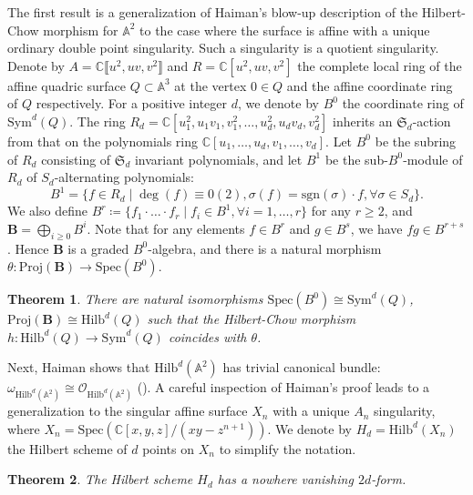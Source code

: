 \documentclass{amsart}[12pt]
\newtheorem{theorem}{Theorem}[section]
\theoremstyle{definition}
\theoremstyle{remark}
\numberwithin{equation}{section}
\begin{document}
The first result is a generalization of Haiman's blow-up description of the Hilbert-Chow morphism for $\mathbb{A}^2$ to the case where the surface is affine with a unique ordinary double point singularity. Such a singularity is a quotient singularity. Denote by $A = \mathbb{C}\llbracket u^2, uv, v^2 \rrbracket$ and $R = \mathbb{C}[u^2, uv, v^2]$ the complete local ring of the affine quadric surface $Q \subset \mathbb{A}^3$ at the vertex $0 \in Q$ and the affine coordinate ring of $Q$ respectively. For a positive integer $d$, we denote by $B^0$ the coordinate ring of $\mathrm{Sym}^d(Q)$. The ring $R_{d} = \mathbb{C}[u_1^2, u_1v_1, v_1^2, \dots, u_d^2, u_dv_d, v_d^2]$ inherits an $\mathfrak{S}_d$-action from that on the polynomials ring $\mathbb{C}[u_1, \dots, u_d, v_1, \dots, v_d]$. Let $B^0$ be the subring of $R_d$ consisting of $\mathfrak{S}_d$ invariant polynomials, and let $B^1$ be the sub-$B^0$-module of $R_d$ of $S_d$-alternating polynomials:
\[
B^1 = \{f \in R_d \mid \deg(f) \equiv 0(2),  \sigma  (f) = \mathrm{sgn}(\sigma) \cdot f, \forall \sigma \in S_d\}.
\]
We also define $B^r \coloneqq \{f_1 \cdot \dots \cdot f_r \mid f_i \in B^1, \forall i = 1, \dots, r\}$ for any $r \geq 2$, and $\mathbf{B} = \bigoplus_{i \geq 0}B^i$.
Note that for any elements $f \in B^r$ and $g \in B^s$, we have $fg \in B^{r + s}$. Hence $\mathbf{B}$ is a graded $B^0$-algebra, and there is a natural morphism $\theta: \mathrm{Proj}(\mathbf{B}) \to \mathrm{Spec}(B^0)$.

\begin{theorem}\label{blowup}
There are natural isomorphisms $\mathrm{Spec}(B^0) \cong \mathrm{Sym}^d(Q)$, $\mathrm{Proj}(\mathbf{B}) \cong \mathrm{Hilb}^d(Q)$ such that the Hilbert-Chow morphism $h: \mathrm{Hilb}^d(Q) \to \mathrm{Sym}^d(Q)$ coincides with $\theta$.
\end{theorem}

Next, Haiman shows that $\mathrm{Hilb}^d(\mathbb{A}^2)$ has trivial canonical bundle: $\omega_{\mathrm{Hilb}^d(\mathbb{A}^2)} \cong \mathcal{O}_{\mathrm{Hilb}^d(\mathbb{A}^2)}$ (\cite[Section 3.6]{H01}). A careful inspection of Haiman's proof leads to a generalization to the singular affine surface $X_n$ with a unique $A_n$ singularity, where $X_n = \mathrm{Spec}(\mathbb{C}[x, y, z]/(xy - z^{n + 1}))$. We denote by $H_d = \mathrm{Hilb}^d(X_n)$ the Hilbert scheme of $d$ points on $X_n$ to simplify the notation. 
\begin{theorem}\label{canonicalbundle}
The Hilbert scheme $H_d$ has a nowhere vanishing $2d$-form.
\end{theorem}
\end{document}
